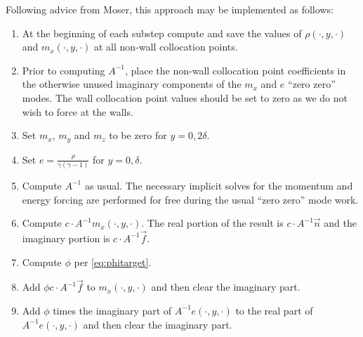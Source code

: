 \documentclass[letterpaper,11pt,nointlimits,reqno]{amsart}
\begin{document}
Following advice from Moser, this approach may be implemented as follows:
\begin{enumerate}
  \item At the beginning of each substep compute and save the values of
    $\rho\!\left(\cdot,y,\cdot\right)$ and $m_x\!\left(\cdot,y,\cdot\right)$
    at all non-wall collocation points.
  \item Prior to computing $A^{-1}$, place the non-wall collocation point
    coefficients in the otherwise unused imaginary components of the
    $m_x$ and $e$ ``zero zero'' modes.  The wall collocation point values
    should be set to zero as we do not wish to force at the walls.
  \item Set $m_x$, $m_y$ and $m_z$ to be zero for $y=0,2\delta$.
  \item Set $e = \frac{\rho}{\gamma\left(\gamma-1\right)}$ for $y = 0,\delta$.
  \item Compute $A^{-1}$ as usual.  The necessary implicit solves for the
    momentum and energy forcing are performed for free during the usual
    ``zero zero'' mode work.
  \item Compute $c\cdot{}A^{-1}m_x\!\left(\cdot,y,\cdot\right)$.
    The real portion of the result is $c\cdot{}A^{-1}\vec{n}$
    and the imaginary portion is $c\cdot{}A^{-1}\vec{f}$.
  \item Compute $\phi$ per \eqref{eq:phitarget}.
  \item Add $\phi{}c\cdot{}A^{-1}\vec{f}$ to $m_x\!\left(\cdot,y,\cdot\right)$
        and then clear the imaginary part.
  \item Add $\phi$ times the imaginary part of $A^{-1}e\!\left(\cdot,y,\cdot\right)$
        to the real part of $A^{-1}e\!\left(\cdot,y,\cdot\right)$
        and then clear the imaginary part.
\end{enumerate}



\end{document}
